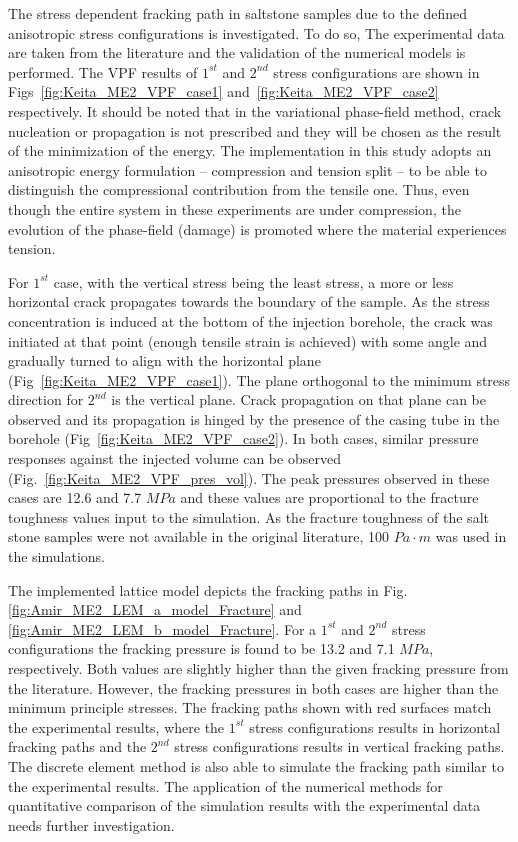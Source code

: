  The stress dependent fracking path in saltstone samples due to the defined anisotropic stress configurations is investigated. To do so,  The experimental data are taken from the literature and the validation of the numerical models is performed. 
 The VPF results of  $1^{st}$ and $2^{nd}$ stress configurations are shown in Figs~\ref{fig:Keita_ME2_VPF_case1} and~\ref{fig:Keita_ME2_VPF_case2} respectively.
 It should be noted that in the variational phase-field method, crack nucleation or propagation is not prescribed and they will be chosen as the result of the minimization of the energy.
 The implementation in this study adopts an anisotropic energy formulation -- compression and tension split -- to be able to distinguish the compressional contribution from the tensile one.
 Thus, even though the entire system in these experiments are under compression, the evolution of the phase-field (damage) is promoted where the material experiences tension.
 
 For $1^{st}$ case, with the vertical stress being the least stress, a more or less horizontal crack propagates towards the boundary of the sample.
 As the stress concentration is induced at the bottom of the injection borehole, the crack was initiated at that point (enough tensile strain is achieved) with some angle and gradually turned to align with the horizontal plane (Fig~\ref{fig:Keita_ME2_VPF_case1}).
 The plane orthogonal to the minimum stress direction for $2^{nd}$ is the vertical plane.
 Crack propagation on that plane can be observed and its propagation is hinged by the presence of the casing tube in the borehole (Fig~\ref{fig:Keita_ME2_VPF_case2}).
 In both cases, similar pressure responses against the injected volume can be observed (Fig.~\ref{fig:Keita_ME2_VPF_pres_vol}). 
 The peak pressures observed in these cases are 12.6 and 7.7 $MPa$ and these values are proportional to the fracture toughness values input to the simulation.
 As the fracture toughness of the salt stone samples were not available in the original literature, 100 $Pa \cdot m$ was used in the simulations. 
 
 The implemented lattice model depicts the fracking paths in Fig.  \ref{fig:Amir_ME2_LEM_a_model_Fracture} and \ref{fig:Amir_ME2_LEM_b_model_Fracture}. For a $1^{st}$ and $2^{nd}$ stress configurations the fracking pressure is found to be 13.2 and 7.1 $MPa$, respectively. Both values are slightly higher than the given fracking pressure from the literature. However, the fracking pressures in both cases are higher than the minimum principle stresses. The fracking paths shown with red surfaces match the experimental results, where the $1^{st}$ stress configurations results in horizontal fracking paths and the $2^{nd}$ stress configurations results in vertical fracking paths. The discrete element method is also able to simulate the fracking path similar to the experimental results. The application of the numerical methods for quantitative comparison of the simulation results with the experimental data needs further investigation. 
